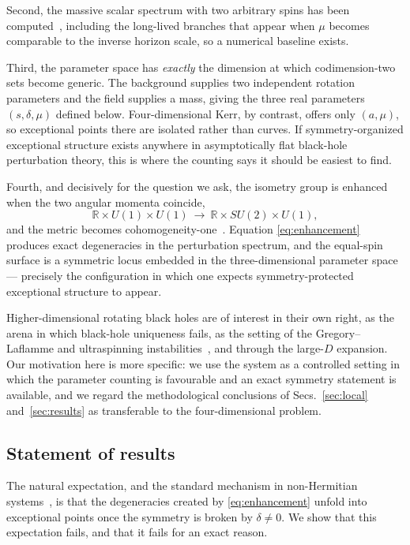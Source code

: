 \documentclass[aps,prd,reprint,superscriptaddress,nofootinbib,longbibliography]{revtex4-2}
\theoremstyle{plain}
\theoremstyle{definition}
\theoremstyle{remark}
\begin{document}
Second, the massive scalar spectrum with two arbitrary spins has been
computed~\cite{Huang2025A16,Lietal2023A15,Lu2023A14}, including the long-lived
branches that appear when $\mu$ becomes comparable to the inverse horizon scale,
so a numerical baseline exists.

Third, the parameter space has \emph{exactly} the dimension at which
codimension-two sets become generic. The background supplies two independent
rotation parameters and the field supplies a mass, giving the three real
parameters $(s,\delta,\mu)$ defined below. Four-dimensional Kerr, by contrast,
offers only $(a,\mu)$, so exceptional points there are isolated rather than
curves. If symmetry-organized exceptional structure exists anywhere in
asymptotically flat black-hole perturbation theory, this is where the counting
says it should be easiest to find.

Fourth, and decisively for the question we ask, the isometry group is enhanced
when the two angular momenta coincide,
\begin{equation}\label{eq:enhancement}
  \mathbb{R}\times U(1)\times U(1)\ \longrightarrow\
  \mathbb{R}\times SU(2)\times U(1),
\end{equation}
and the metric becomes cohomogeneity-one~\cite{Murata2008A06}. Equation
\eqref{eq:enhancement} produces exact degeneracies in the perturbation spectrum,
and the equal-spin surface is a symmetric locus embedded in the
three-dimensional parameter space --- precisely the configuration in which one
expects symmetry-protected exceptional structure to appear.

Higher-dimensional rotating black holes are of interest in their own right, as
the arena in which black-hole uniqueness fails, as the setting of the
Gregory--Laflamme and ultraspinning
instabilities~\cite{Diasetal2010A07,Emparan2014A08}, and through the large-$D$
expansion. Our motivation here is more specific: we use the system as a
controlled setting in which the parameter counting is favourable and an exact
symmetry statement is available, and we regard the methodological conclusions of
Secs.~\ref{sec:local} and~\ref{sec:results} as transferable to the
four-dimensional problem.

\subsection{Statement of results}\label{sec:intro:results}

The natural expectation, and the standard mechanism in non-Hermitian
systems~\cite{Zhangetal2022E66,Mandal2021E65}, is that the degeneracies created
by \eqref{eq:enhancement} unfold into exceptional points once the symmetry is
broken by $\delta\ne0$. We show that this expectation fails, and that it fails
for an exact reason.
\end{document}
